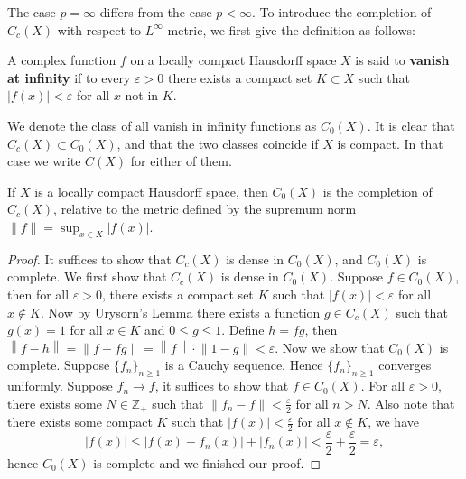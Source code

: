 The case $p=\infty$ differs from the case $p<\infty$. To introduce the completion of $C_c(X)$ with respect to $L^\infty$-metric, we first give the definition as follows:
\begin{definition}
A complex function $f$ on a locally compact Hausdorff space $X$ is said to \textbf{vanish at infinity} if to every $\varepsilon>0$ there exists a compact set $K\subset X$ such that $|f(x)|<\varepsilon$ for all $x$ not in $K$.
\end{definition}
We denote the class of all vanish in infinity functions as $C_0(X)$. It is clear that $C_c(X)\subset C_0(X)$, and that the two classes coincide if $X$ is compact. In that case we write $C(X)$ for either of them.
\begin{theorem}
If $X$ is a locally compact Hausdorff space, then $C_0(X)$ is the completion of $C_c(X)$, relative to the metric defined by the supremum norm $\|f\|=\sup_{x\in X}|f(x)|$.
\end{theorem}
\begin{proof}
It suffices to show that $C_c(X)$ is dense in $C_0(X)$, and $C_0(X)$ is complete. We first show that $C_c(X)$ is dense in $C_0(X)$. Suppose $f\in C_0(X)$, then for all $\varepsilon>0$, there exists a compact set $K$ such that $|f(x)|<\varepsilon$ for all $x\notin K$. Now by Urysorn's Lemma there exists a function $g\in C_c(X)$ such that $g(x)=1$ for all $x\in K$ and $0\le g\le 1$. Define $h=fg$, then $\left\| f-h \right\| =\left\| f-fg \right\| =\left\| f \right\| \cdot \left\| 1-g \right\| <\varepsilon $. Now we show that $C_0(X)$ is complete. Suppose $\{f_n\}_{n\ge 1}$ is a Cauchy sequence. Hence $\{f_n\}_{n\ge 1}$ converges uniformly. Suppose $f_n\to f$, it suffices to show that $f\in C_0(X)$. For all $\varepsilon>0$, there exists some $N\in\mathbb{Z}_+$ such that $\|f_n-f\|<\frac{\varepsilon}{2}$ for all $n>N$. Also note that there exists some compact $K$ such that $|f(x)|<\frac{\varepsilon}{2}$ for all $x\notin K$, we have 
$$
\left| f\left( x \right) \right|\le \left| f\left( x \right) -f_n\left( x \right) \right|+\left| f_n\left( x \right) \right|<\frac{\varepsilon}{2}+\frac{\varepsilon}{2}=\varepsilon ,
$$
hence $C_0(X)$ is complete and we finished our proof.
\end{proof}
